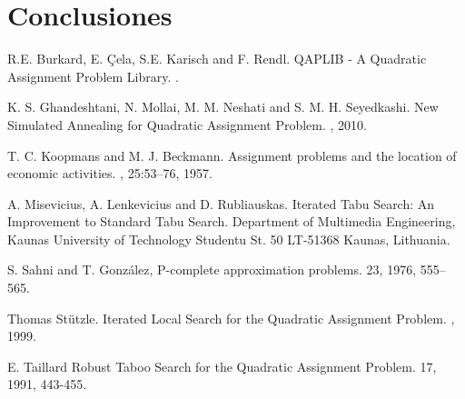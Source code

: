 \documentclass{ci5652}
\begin{document}
\section*{Conclusiones}


%


\small


\begin{thebibliography}{99}

R.E. Burkard, E. Çela, S.E. Karisch and F. Rendl.
\newblock QAPLIB - A Quadratic Assignment Problem Library.
.

K. S. Ghandeshtani, N. Mollai, M. M. Neshati and S. M. H. Seyedkashi.
\newblock New Simulated Annealing for Quadratic Assignment Problem.
, 2010.


T. C. Koopmans and M. J. Beckmann. 
\newblock Assignment problems and the location of economic activities.
, 25:53–76, 1957.

A. Misevicius, A. Lenkevicius and D. Rubliauskas.
\newblock Iterated Tabu Search: An Improvement to Standard Tabu Search.
\newblock Department of Multimedia Engineering, Kaunas University of Technology Studentu St. 50 LT-51368 Kaunas, Lithuania.

S. Sahni and T. González, 
\newblock P-complete approximation problems.
 23, 1976, 555–565.

Thomas Stützle.
\newblock Iterated Local Search for the Quadratic Assignment Problem.
, 1999.

E. Taillard
\newblock Robust Taboo Search for the Quadratic Assignment Problem.
 17, 1991, 443-455.


\end{thebibliography}

\end{document}

